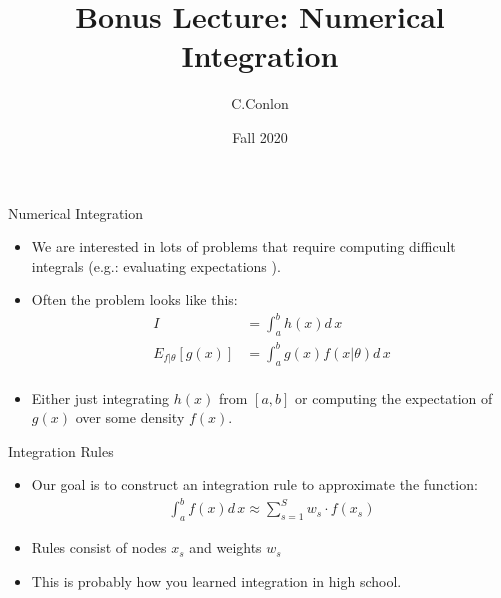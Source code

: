 \def\beamerclassoptions{[xcolor=pdftex,dvipsnames,table,mathserif,aspectratio=169]}


\usepackage[english]{babel}
\usepackage{pgf,pgfarrows,pgfnodes,pgfautomata,pgfheaps}
\usepackage{amsmath,amssymb,setspace}
\usepackage[latin1]{inputenc}
\usepackage[T1]{fontenc}
\usepackage{relsize}
\usepackage[absolute,overlay]{textpos} 
\newenvironment{reference}[2]{%
  \begin{textblock*}{\textwidth}(#1,#2) 
      \footnotesize\it\bgroup\color{red!50!black}}{\egroup\end{textblock*}} 



\title{Bonus Lecture: Numerical Integration}
\author{C.Conlon}
\date{Fall 2020}


\frame{\titlepage}

\begin{frame}{Numerical Integration}
\begin{itemize}
\item  We are interested in lots of problems that require computing difficult integrals (e.g.: evaluating expectations ).\\
\item Often the problem looks like this:
\begin{align*}
I &= \int_{a}^b h(x) d\,x\\
E_{f| \theta}[g(x)] &= \int_{a}^b g(x) f(x | \theta) d\,x\\
\end{align*}
\item Either just integrating $h(x)$ from $[a,b]$ or computing the expectation of $g(x)$ over some density $f(x)$.
\end{itemize}
\end{frame}


\begin{frame}{Integration Rules}

\begin{itemize}
\item Our goal is to construct an \alert{integration rule} to approximate the function:
\begin{align*}
\int_{a}^{b} f(x) d\, x \approx \sum_{s=1}^S w_s \cdot f(x_s)
\end{align*}
\item Rules consist of \alert{nodes} $x_s$ and \alert{weights} $w_s$
\item This is probably how you learned integration in high school.
\end{itemize}
\end{frame}


